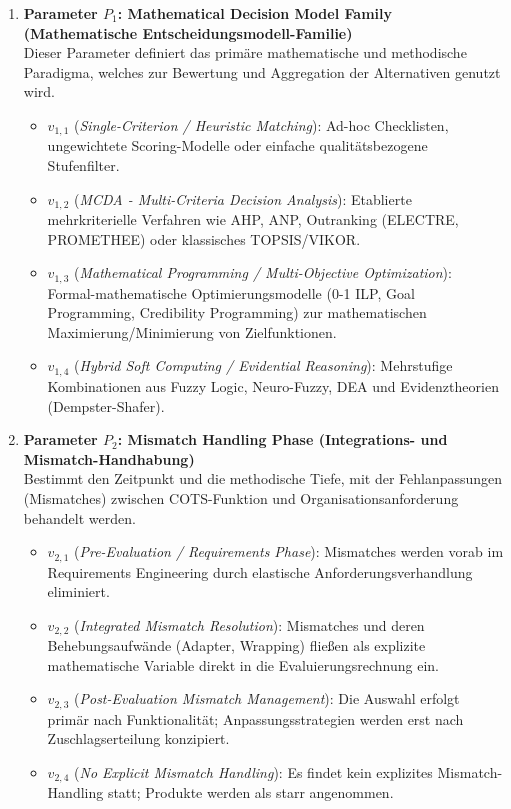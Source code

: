 \begin{enumerate}
    \item \textbf{Parameter $P_1$: Mathematical Decision Model Family (Mathematische Entscheidungsmodell-Familie)} \\
    Dieser Parameter definiert das primäre mathematische und methodische Paradigma, welches zur Bewertung und Aggregation der Alternativen genutzt wird.
    \begin{itemize}
        \item $v_{1,1}$ (\textit{Single-Criterion / Heuristic Matching}): Ad-hoc Checklisten, ungewichtete Scoring-Modelle oder einfache qualitätsbezogene Stufenfilter.
        \item $v_{1,2}$ (\textit{MCDA - Multi-Criteria Decision Analysis}): Etablierte mehrkriterielle Verfahren wie AHP, ANP, Outranking (ELECTRE, PROMETHEE) oder klassisches TOPSIS/VIKOR.
        \item $v_{1,3}$ (\textit{Mathematical Programming / Multi-Objective Optimization}): Formal-mathematische Optimierungsmodelle (0-1 ILP, Goal Programming, Credibility Programming) zur mathematischen Maximierung/Minimierung von Zielfunktionen.
        \item $v_{1,4}$ (\textit{Hybrid Soft Computing / Evidential Reasoning}): Mehrstufige Kombinationen aus Fuzzy Logic, Neuro-Fuzzy, DEA und Evidenztheorien (Dempster-Shafer).
    \end{itemize}

    \item \textbf{Parameter $P_2$: Mismatch Handling Phase (Integrations- und Mismatch-Handhabung)} \\
    Bestimmt den Zeitpunkt und die methodische Tiefe, mit der Fehlanpassungen (Mismatches) zwischen COTS-Funktion und Organisationsanforderung behandelt werden.
    \begin{itemize}
        \item $v_{2,1}$ (\textit{Pre-Evaluation / Requirements Phase}): Mismatches werden vorab im Requirements Engineering durch elastische Anforderungsverhandlung eliminiert.
        \item $v_{2,2}$ (\textit{Integrated Mismatch Resolution}): Mismatches und deren Behebungsaufwände (Adapter, Wrapping) fließen als explizite mathematische Variable direkt in die Evaluierungsrechnung ein.
        \item $v_{2,3}$ (\textit{Post-Evaluation Mismatch Management}): Die Auswahl erfolgt primär nach Funktionalität; Anpassungsstrategien werden erst nach Zuschlagserteilung konzipiert.
        \item $v_{2,4}$ (\textit{No Explicit Mismatch Handling}): Es findet kein explizites Mismatch-Handling statt; Produkte werden als starr angenommen.
    \end{itemize}


\end{enumerate}
